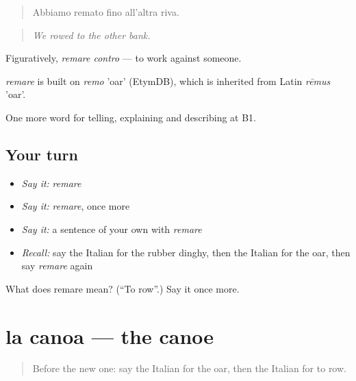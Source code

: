 \begin{quote}
Abbiamo remato fino all'altra riva.
\end{quote}

\begin{quote}
\emph{We rowed to the other bank.}
\end{quote}

Figuratively, \emph{remare contro} — to work against someone.

\begin{cousinweb}
\emph{remare} is built on \emph{remo} 'oar' (EtymDB), which is inherited from Latin \emph{rēmus} 'oar'.
\end{cousinweb}

\begin{grammarlens}[title={What you've built}]
One more word for telling, explaining and describing at B1.
\end{grammarlens}

\subsection*{Your turn}
\begin{itemize}
\raggedright
  \item \emph{Say it:} \emph{remare}
  \item \emph{Say it:} \emph{remare}, once more
  \item \emph{Say it:} a sentence of your own with \emph{remare}
  \item \emph{Recall:} say the Italian for the rubber dinghy, then the Italian for the oar, then say \emph{remare} again
\end{itemize}

\begin{tcolorbox}[breakable,colback=teal!4,colframe=teal!35!black,title={Before you move on}]
What does remare mean? (\textquotedblleft{}To row\textquotedblright{}.) Say it once more.
\end{tcolorbox}
\section[la canoa]{la canoa — the canoe}

\label{lesson:IT-C422-canoa}



\begin{quote}
Before the new one: say the Italian for the oar, then the Italian for to row.
\end{quote}

